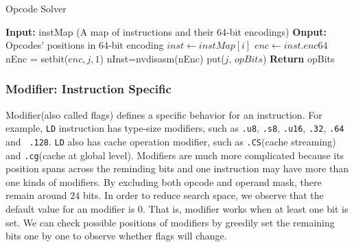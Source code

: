 \begin{algorithm}[htbp]
      \caption{Opcode Solver}\label{algo:opcode}
  \begin{algorithmic}[1]
      \State \textbf {Input:} instMap (A map of instructions and their 64-bit encodings)
      \State \textbf {Onput:} Opcodes' positions in 64-bit encoding
      \State $inst \gets instMap[i]$
      \State $enc \gets inst.enc64$
      \State nEnc = setbit($enc, j, 1$)
      \State nInst=nvdisasm(nEnc)
      \State put($j$, $opBits$)
      \EndIf
      \EndIf
      \EndFor
      \EndFor
      \State \textbf{Return} opBits %
  \end{algorithmic}
\end{algorithm}

\subsubsection{Modifier: Instruction Specific}

Modifier(also called flags) defines a specific behavior for an instruction. For example,
{\tt LD} instruction has type-size modifiers, such as {\tt .u8}, {\tt .s8}, {\tt .u16}, {\tt .32}, {\tt .64} and {\tt 
.128}. {\tt LD} also has cache operation modifier, such as {\tt .CS}(cache streaming) and {\tt .cg}(cache at global 
level). Modifiers are much more complicated because its position spans across the reminding bits and one instruction 
may have more than one kinds of modifiers. By excluding both opcode and operand mask, there remain around $24$ bits. In 
order to reduce search space, we observe that the default value for an modifier is $0$. That is, modifier works when at 
least one bit is set. We can check possible positions of modifiers by greedily set the remaining bits one by one to 
observe whether flags will change.
